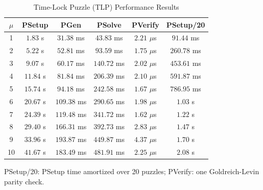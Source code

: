 
\begin{table}[htbp]
\centering
\caption{Time-Lock Puzzle (TLP) Performance Results}
\label{tab:tlp_results}
\begin{tabular}{|c|c|c|c|c|c|}
\hline
\textbf{$\mu$} & \textbf{PSetup} & \textbf{PGen} & \textbf{PSolve} & \textbf{PVerify} & \textbf{PSetup/20} \\
\hline
1 & $1.83$ s & $31.38$ ms & $43.83$ ms & $2.21$ $\mu$s & $91.44$ ms \\
2 & $5.22$ s & $52.81$ ms & $93.59$ ms & $1.75$ $\mu$s & $260.78$ ms \\
3 & $9.07$ s & $60.17$ ms & $140.72$ ms & $2.02$ $\mu$s & $453.61$ ms \\
4 & $11.84$ s & $81.84$ ms & $206.39$ ms & $2.10$ $\mu$s & $591.87$ ms \\
5 & $15.74$ s & $94.18$ ms & $242.58$ ms & $1.67$ $\mu$s & $786.95$ ms \\
6 & $20.67$ s & $109.38$ ms & $290.65$ ms & $1.98$ $\mu$s & $1.03$ s \\
7 & $24.39$ s & $119.48$ ms & $341.72$ ms & $1.62$ $\mu$s & $1.22$ s \\
8 & $29.40$ s & $166.31$ ms & $392.73$ ms & $2.83$ $\mu$s & $1.47$ s \\
9 & $33.96$ s & $193.87$ ms & $449.87$ ms & $4.37$ $\mu$s & $1.70$ s \\
10 & $41.67$ s & $183.49$ ms & $481.91$ ms & $2.25$ $\mu$s & $2.08$ s \\
\hline
\end{tabular}
\footnotesize{PSetup/20: PSetup time amortized over 20 puzzles; PVerify: one Goldreich-Levin parity check.}
\end{table}
